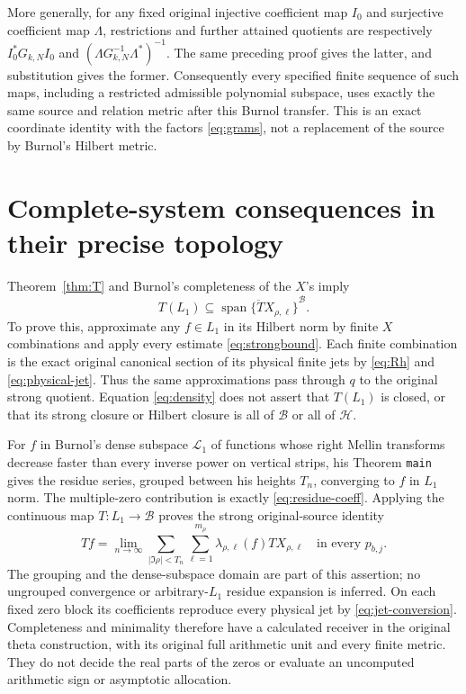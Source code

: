 \documentclass[11pt]{article}
\newcommand{\B}{\mathscr B}\newcommand{\HH}{\mathcal H}
\begin{document}
More generally, for any fixed original injective coefficient
map $I_0$ and surjective coefficient map $\Lambda$, restrictions
and further attained quotients are respectively
$I_0^*G_{k,N}I_0$ and
$(\Lambda G_{k,N}^{-1}\Lambda^*)^{-1}$.
The same preceding proof gives the latter, and substitution
gives the former. Consequently every specified finite
sequence of such maps, including a restricted admissible
polynomial subspace, uses exactly the same source and
relation metric after this Burnol transfer. This is an exact
coordinate identity with the factors \eqref{eq:grams}, not
a replacement of the source by Burnol's Hilbert metric.

\section{Complete-system consequences in their precise topology}

Theorem~\ref{thm:T} and Burnol's completeness of the $X$'s imply
\begin{equation}\label{eq:density}
 T(L_1)\subseteq
 \overline{\operatorname{span}\{T X_{\rho,\ell}\}}^{\B}.
\end{equation}
To prove this, approximate any $f\in L_1$ in its Hilbert
norm by finite $X$ combinations and apply every estimate
\eqref{eq:strongbound}. Each finite combination is the exact
original canonical section of its physical finite jets by
\eqref{eq:Rh} and \eqref{eq:physical-jet}. Thus the same
approximations pass through $q$ to the original strong quotient.
Equation \eqref{eq:density} does not assert that $T(L_1)$
is closed, or that its strong closure or Hilbert closure is
all of $\B$ or all of $\HH$.

For $f$ in Burnol's dense subspace $\mathcal L_1$ of functions
whose right Mellin transforms decrease faster than every
inverse power on vertical strips, his Theorem \texttt{main}
gives the residue series, grouped between his heights $T_n$,
converging to $f$ in $L_1$ norm. The multiple-zero contribution
is exactly \eqref{eq:residue-coeff}. Applying the continuous
map $T:L_1\to\B$ proves the strong original-source identity
\begin{equation}\label{eq:strong-residue}
 Tf=\lim_{n\to\infty}
 \sum_{|\Im\rho|<T_n}\sum_{\ell=1}^{m_\rho}
                         \lambda_{\rho,\ell}(f)T X_{\rho,\ell}
                    \quad\text{in every }p_{b,j}.
\end{equation}
The grouping and the dense-subspace domain are part of this
assertion; no ungrouped convergence or arbitrary-$L_1$
residue expansion is inferred. On each fixed zero block its
coefficients reproduce every physical jet by
\eqref{eq:jet-conversion}. Completeness and minimality
therefore have a calculated receiver in the original
theta construction, with its original full arithmetic
unit and every finite metric. They do not decide the
real parts of the zeros or evaluate an uncomputed
arithmetic sign or asymptotic allocation.
\end{document}
